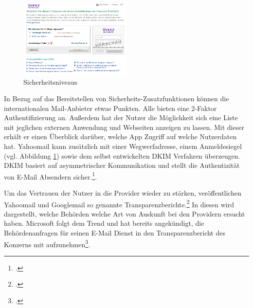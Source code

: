 \documentclass  [paper=a4,
				fontsize=12pt,
				listof=totoc,
				bibliography=totoc
				]{scrreprt}
\begin{document}
			\begin{figure} %
							\includegraphics[width=0.5\textwidth]{images/yahoo_anmeldesiegel.png}
							\caption {Sicherheitsniveaus}
							\label{fig:Yahoo_Anmeldesiegel}	
						\end{figure}
			In Bezug auf das Bereitstellen von Sicherheits-Zusatzfunktionen können die internationalen Mail-Anbieter etwas Punkten. Alle bieten eine 2-Faktor Authentifizierung an. Außerdem hat der Nutzer die Möglichkeit sich eine Liste mit jeglichen externen Anwendung und Webseiten anzeigen zu lassen. Mit dieser erhält er einen Überblick darüber, welche App Zugriff auf welche Nutzerdaten hat.
			Yahoomail kann zusätzlich mit einer Wegwerfadresse, einem Anmeldesiegel (vgl. Abbildung \ref{fig:Yahoo_Anmeldesiegel}) sowie dem selbst entwickelten \ac{DKIM} Verfahren überzeugen. \ac{DKIM} basiert auf asymmetrischer Kommunikation und stellt die Authentizität von E-Mail Absendern sicher.\footcite[Vgl.][]{DKIM}.
			
			
			
			\medskip
			
			Um das Vertrauen der Nutzer in die Provider wieder zu stärken, veröffentlichen Yahoomail und Googlemail  so genannte Transparenzberichte.\footcite[Vgl.][]{Lokshin} In diesen wird dargestellt, welche Behörden welche Art von Auskunft bei den Providern ersucht haben. Microsoft folgt dem Trend und hat bereits angekündigt, die Behördenanfragen für seinen E-Mail Dienst in den Transparenzbericht des Konzerns mit aufzunehmen\footcite[Vgl.][]{Herget}.
			\medskip			
		
\end{document}
